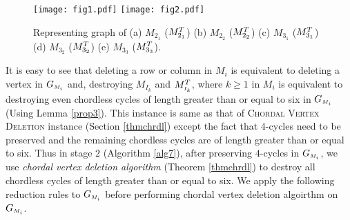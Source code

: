 \documentclass[review, 1p]{elsarticle}
\begin{document}
\begin{figure}[h]
 \begin{center} \texttt{[image: fig1.pdf]}
 \texttt{[image: fig2.pdf]} 
 \end{center}
  \caption{Representing graph of (a) $M_{2_{1}}$ ($M^{\tiny T}_{2_{1}}$) (b) $M_{2_{2}}$ ($M^{\tiny T}_{2_{2}}$) (c) $M_{3_{1}}$ ($M^{\tiny T}_{3_{1}}$) (d) $M_{3_{2}}$ ($M^{\tiny T}_{3_{2}}$)  \hspace{.95 in}(e) $M_{3_{3}}$ ($M^{\tiny T}_{3_{3}}$).}
  \label{forbidden subgraph}
\end{figure}
 \newpage It is easy to see that deleting a row or column in $M_{i}$ is equivalent to deleting a vertex in $G_{\mathsmaller M_{i}}$ and, destroying $M_{I_{k}}$ and $M^{T}_{\mathsmaller{I_{k}}}$, where $k \geq 1$ in $M_{i}$ is equivalent to destroying even chordless cycles of length greater than or equal to six in $G_{\mathsmaller M_{i}}$ (Using Lemma \ref{prop3}). This instance is same as that of \textsc{Chordal Vertex Deletion} instance (Section \ref{thmchrdl}) except the fact that $4$-cycles need to be preserved and the remaining chordless cycles are of length greater than or equal to six. Thus in stage $2$ (Algorithm \ref{alg7}), after preserving $4$-cycles in $G_{\mathsmaller M_{i}}$, we use \textit{chordal vertex deletion algorithm} (Theorem \ref{thmchrdl}) to destroy all chordless cycles of length greater than or equal to six. We apply the following reduction rules to $G_{\mathsmaller M_{i}}$ before performing chordal vertex deletion algoirthm on $G_{\mathsmaller M_{i}}$. \\
\end{document}
